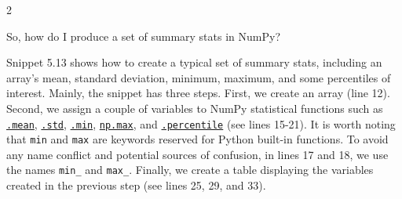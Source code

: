 \documentclass[a4paper,11pt]{book}
\newcommand{\question}[1]{%
    \begin{tcolorbox}[colback=comp_c!10,colframe=comp_c,sidebyside align=top,width=\linewidth,before skip=1ex]
        #1
    \end{tcolorbox}
    \switchcolumn%
}
\newcommand{\note}[1]{%
    \begin{tcolorbox}[colback=white!0,colframe=white!10,width=\linewidth,before skip=1ex]
        #1
    \end{tcolorbox}
}
\begin{document}
\clearpage
\begin{paracol}{2}
	\question{\raggedright So, how do I produce a set of summary stats in NumPy?}
	\note{Snippet 5.13 shows how to create a typical set of summary stats, including an array's mean, standard deviation, minimum, maximum, and some percentiles of interest. Mainly, the snippet has three steps. First, we create an array (line 12). Second, we assign a couple of variables to NumPy statistical functions such as \href{https://numpy.org/doc/stable/reference/generated/numpy.mean.html\#numpy.mean}{\texttt{.mean}}, \href{https://numpy.org/doc/stable/reference/generated/numpy.std.html\#numpy.std}{\texttt{.std}}, \href{https://numpy.org/doc/stable/reference/generated/numpy.ndarray.min.html}{\texttt{.min}}, \href{https://numpy.org/doc/stable/reference/generated/numpy.ndarray.max.html}{\texttt{np.max}}, and \href{https://numpy.org/doc/stable/reference/generated/numpy.percentile. html\#numpy.percentile}{\texttt{.percentile}} (see lines 15-21). It is worth noting that \texttt{min} and \texttt{max} are keywords reserved for Python built-in functions. To avoid any name conflict and potential sources of confusion, in lines 17 and 18, we use the names \texttt{min\_} and \texttt{max\_}. Finally, we create a table displaying the variables created in the previous step (see lines 25, 29, and 33).} 
\end{paracol}
\end{document}
